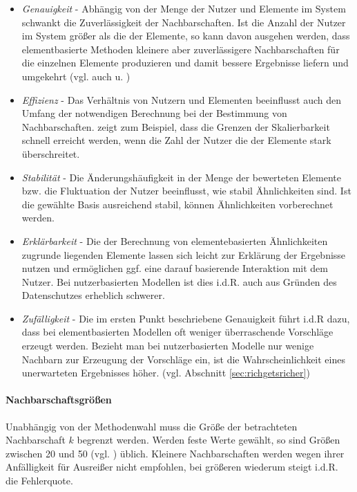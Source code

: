 \begin{itemize}
\item \textit{Genauigkeit} - Abhängig von der Menge der Nutzer und Elemente im System schwankt die Zuverlässigkeit der Nachbarschaften. Ist die Anzahl der Nutzer im System größer als die der Elemente, so kann davon ausgehen werden, dass elementbasierte Methoden kleinere aber zuverlässigere Nachbarschaften für die einzelnen Elemente produzieren und damit bessere Ergebnisse liefern und umgekehrt (vgl. auch \citep{Huete:2012:UPA:2206442.2206675} u. \citep{Herlocker:2002:EAD:593967.594047})
\item \textit{Effizienz} - Das Verhältnis von Nutzern und Elementen beeinflusst auch den Umfang der notwendigen Berechnung bei der Bestimmung von Nachbarschaften. \citep{linden03} zeigt zum Beispiel, dass die Grenzen der Skalierbarkeit schnell erreicht werden, wenn die Zahl der Nutzer die der Elemente stark überschreitet.
\item \textit{Stabilität} - Die Änderungshäufigkeit in der Menge der bewerteten Elemente bzw. die Fluktuation der Nutzer beeinflusst, wie stabil Ähnlichkeiten sind. Ist die gewählte Basis ausreichend stabil, können Ähnlichkeiten vorberechnet werden.
\item \textit{Erklärbarkeit} - Die der Berechnung von elementebasierten Ähnlichkeiten zugrunde liegenden Elemente lassen sich leicht zur Erklärung der Ergebnisse nutzen und ermöglichen ggf. eine darauf basierende Interaktion mit dem Nutzer. Bei nutzerbasierten Modellen ist dies i.d.R. auch aus Gründen des Datenschutzes erheblich schwerer.
\item \textit{Zufälligkeit} - Die im ersten Punkt beschriebene Genauigkeit führt i.d.R dazu, dass bei elementbasierten Modellen oft weniger überraschende Vorschläge erzeugt werden. Bezieht man bei nutzerbasierten Modelle nur wenige Nachbarn zur Erzeugung der Vorschläge ein, ist die Wahrscheinlichkeit eines unerwarteten Ergebnisses höher. (vgl. Abschnitt \ref{sec:richgetsricher})
\end{itemize}

\paragraph{Nachbarschaftsgrößen} Unabhängig von der Methodenwahl muss die Größe der betrachteten Nachbarschaft $k$ begrenzt werden. Werden feste Werte gewählt, so sind Größen zwischen 20 und 50 (vgl. \citep{Herlocker:2002:EAD:593967.594047}) üblich. Kleinere Nachbarschaften werden wegen ihrer Anfälligkeit für Ausreißer nicht empfohlen, bei größeren wiederum steigt i.d.R. die Fehlerquote.

